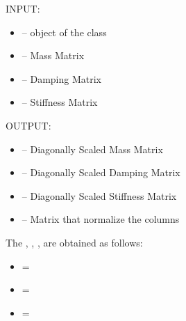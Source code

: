 \documentclass[letterpaper,10pt,english]{sphinxmanual}
\begin{document}
\begin{fulllineitems}
\label{index:diagscale.diag_scale_matrices}
INPUT:
\begin{itemize}
\item {} 
 -- object of the class 

\item {} 
 -- Mass Matrix

\item {} 
 -- Damping Matrix

\item {} 
 -- Stiffness Matrix

\end{itemize}

OUTPUT:
\begin{itemize}
\item {} 
 -- Diagonally Scaled Mass Matrix

\item {} 
 -- Diagonally Scaled Damping Matrix

\item {} 
 -- Diagonally Scaled Stiffness Matrix

\item {} 
 -- Matrix that normalize the columns

\end{itemize}

The  ,  , ,   are obtained as follows:
\begin{itemize}
\item {} 
 = 

\item {} 
 = 

\item {} 
 = 

\end{itemize}

\end{fulllineitems}

\end{document}

